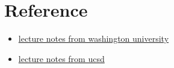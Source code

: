 \section{Reference}
\begin{itemize}
    \item \href{https://sites.math.washington.edu/~burke/crs/408/notes/nlp/direction.pdf}{lecture notes from washington university}
    \item \href{https://math.ucsd.edu/sites/math.ucsd.edu/files/undergrad/honors-program/honors-theses/2019-2020/Jeb_Runnoe_Honors_Thesis.pdf}{lecture notes from ucsd}
\end{itemize}